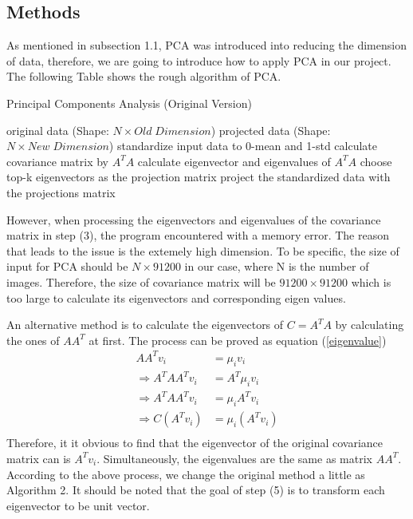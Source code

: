 \documentclass{article}
\begin{document}
\subsection{Methods}
As mentioned in subsection 1.1, PCA was introduced into reducing the dimension of data, therefore, we are going to introduce how to apply PCA in our project. The following Table shows the rough algorithm of PCA.
\begin{algorithm}
        \caption{Principal Components Analysis (Original Version)}
        \begin{algorithmic}[1]
            \Require original data (Shape: $N\times Old \;Dimension$)
            \Ensure  projected data (Shape: $N\times New \;Dimension$)
             \State standardize input data to 0-mean and 1-std
             \State calculate covariance matrix by $A^TA$
             \State calculate eigenvector and eigenvalues of $A^TA$
             \State choose top-k eigenvectors as the projection matrix
             \State project the standardized data with the projections matrix
        \end{algorithmic}
\end{algorithm}
\par
However, when processing the eigenvectors and eigenvalues of the covariance matrix in step (3), the program encountered with a memory error. The reason that leads to the issue is the extemely high dimension. To be specific, the size of input for PCA should be $N\times 91200$ in our case, where N is the number of images. Therefore, the size of covariance matrix will be $91200\times 91200$ which is too large to calculate its eigenvectors and corresponding eigen values.
\par
An alternative method is to calculate the eigenvectors of $C = A^TA$ by calculating the ones of $AA^T$ at first. The process can be proved as equation (\ref{eigenvalue})
\begin{equation}
    \begin{split}
    AA^Tv_i &= \mu_iv_i\\
    \Rightarrow A^TAA^Tv_i &= A^T\mu_iv_i\\
    \Rightarrow A^TAA^Tv_i &= \mu_iA^Tv_i\\
    \Rightarrow C(A^Tv_i)  &= \mu_i(A^Tv_i)\\
    \label{eigenvalue}
    \end{split}
\end{equation}
Therefore, it it obvious to find that the eigenvector of the original covariance matrix can is $A^Tv_i$. Simultaneously, the eigenvalues are the same as matrix $AA^T$. According to the above process, we change the original method a little as Algorithm 2. It should be noted that the goal of step (5) is to transform each eigenvector to be unit vector.
\end{document}
